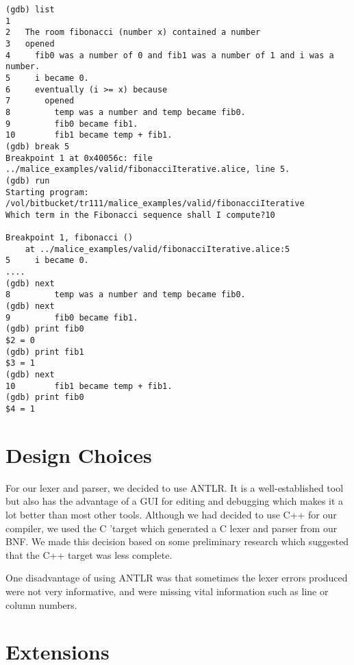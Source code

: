 \documentclass[a4wide, 11pt]{article}
\begin{document}
\begin{verbatim}
(gdb) list
1   
2   The room fibonacci (number x) contained a number
3   opened
4     fib0 was a number of 0 and fib1 was a number of 1 and i was a number.
5     i became 0.
6     eventually (i >= x) because
7       opened
8         temp was a number and temp became fib0.
9         fib0 became fib1.
10        fib1 became temp + fib1.
(gdb) break 5
Breakpoint 1 at 0x40056c: file ../malice_examples/valid/fibonacciIterative.alice, line 5.
(gdb) run
Starting program: /vol/bitbucket/tr111/malice_examples/valid/fibonacciIterative 
Which term in the Fibonacci sequence shall I compute?10

Breakpoint 1, fibonacci ()
    at ../malice_examples/valid/fibonacciIterative.alice:5
5     i became 0.
....
(gdb) next
8         temp was a number and temp became fib0.
(gdb) next
9         fib0 became fib1.
(gdb) print fib0
$2 = 0
(gdb) print fib1
$3 = 1
(gdb) next
10        fib1 became temp + fib1.
(gdb) print fib0
$4 = 1
\end{verbatim}


\section{Design Choices}

For our lexer and parser, we decided to use ANTLR. It is a well-established tool but also has the advantage of a GUI for editing and debugging which makes it a lot better than most other tools. Although we had decided to use C++ for our compiler, we used the C 'target which generated a C lexer and parser from our BNF. We made this decision based on some preliminary research which suggested that the C++ target was less complete.

One disadvantage of using ANTLR was that sometimes the lexer errors produced were not very informative, and were missing vital information such as line or column numbers.

\section{Extensions}
\end{document}
